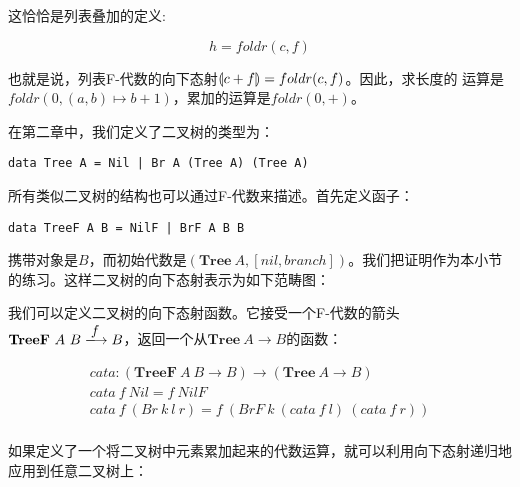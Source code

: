 \documentclass{article}
\begin{document}
\begin{example}
这恰恰是列表叠加的定义:

\[
  h = foldr(c, f)
\]

也就是说，列表F-代数的向下态射$\llparenthesis c + f \rrparenthesis = foldr(c, f)$。因此，求长度的
运算是$foldr(0, (a, b) \mapsto b + 1)$，累加的运算是$foldr(0, +)$。
\end{example}

\begin{example}
在第二章中，我们定义了二叉树的类型为：

\lstset{frame=none}
\begin{lstlisting}
data Tree A = Nil | Br A (Tree A) (Tree A)
\end{lstlisting}

所有类似二叉树的结构也可以通过F-代数来描述。首先定义函子：

\begin{lstlisting}
data TreeF A B = NilF | BrF A B B
\end{lstlisting}

携带对象是$B$，而初始代数是$(\mathbf{Tree}\ A, [nil, branch])$。我们把证明作为本小节的练习。这样二叉树的向下态射表示为如下范畴图：

\begin{center}
\end{center}

我们可以定义二叉树的向下态射函数。它接受一个F-代数的箭头$\mathbf{TreeF}\ A\ B \arrowto{f} B$，返回一个从$\mathbf{Tree}\ A \to B$的函数：

\[
\begin{array}{l}
cata : (\mathbf{TreeF}\ A\ B \to B) \to (\mathbf{Tree}\ A \to B) \\
cata\ f\ Nil = f\ NilF \\
cata\ f\ (Br\ k\ l\ r) =f\ (BrF\ k\ (cata\ f\ l)\ (cata\ f\ r)) \\
\end{array}
\]

如果定义了一个将二叉树中元素累加起来的代数运算，就可以利用向下态射递归地应用到任意二叉树上：


\end{example}
\end{document}
